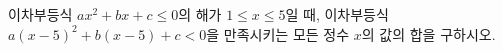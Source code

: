이차부등식 $ax^2+bx+c\le 0$의 해가 $1\le x\le 5$일 때, 이차부등식 $a(x-5)^2+b(x-5)+c<0$을 만족시키는 모든 정수 $x$의 값의 합을 구하시오. 
